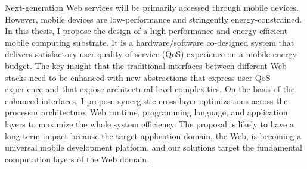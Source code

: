 
%
\utabstract
\indent
Next-generation Web services will be primarily accessed through mobile devices. However, mobile devices are low-performance and stringently energy-constrained. In this thesis, I propose the design of a high-performance and energy-efficient mobile computing substrate. It is a hardware/software co-designed system that delivers satisfactory user quality-of-service (QoS) experience on a mobile energy budget. The key insight that the traditional interfaces between different Web stacks need to be enhanced with new abstractions that express user QoS experience and that expose architectural-level complexities. On the basis of the enhanced interfaces, I propose synergistic cross-layer optimizations across the processor architecture, Web runtime, programming language, and application layers to maximize the whole system efficiency. The proposal is likely to have a long-term impact because the target application domain, the Web, is becoming a universal mobile development platform, and our solutions target the fundamental computation layers of the Web domain.

